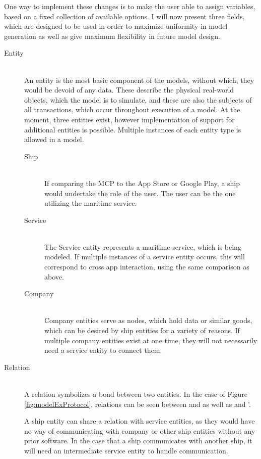 One way to implement these changes is to make the user able to assign variables, based on a fixed collection of available options. I will now present three fields, which are designed to be used in order to maximize uniformity in model generation as well as give maximum flexibility in future model design.
\begin{description}
	\item[Entity]\ \\
	An entity is the most basic component of the models, without which, they would be devoid of any data. These describe the physical real-world objects, which the model is to simulate, and these are also the subjects of all transactions, which occur throughout execution of a model. At the moment, three entities exist, however implementation of support for additional entities is possible.
	Multiple instances of each entity type is allowed in a model.\newpage
	\begin{description}
		\item[Ship]\ \\
			If comparing the MCP to the App Store or Google Play, a ship would undertake the role of the user. The user can be the one utilizing the maritime service.
		\item[Service]\ \\
			The Service entity represents a maritime service, which is being modeled. If multiple instances of a service entity occurs, this will correspond to cross app interaction, using the same comparison as above.
		\item[Company]\ \\
			Company entities serve as nodes, which hold data or similar goods, which can be desired by ship entities for a variety of reasons. If multiple company entities exist at one time, they will not necessarily need a service entity to connect them. 
	\end{description}
	\item[Relation]\ \\
		A relation symbolizes a bond between two entities. In the case of Figure \ref{fig:modelExProtocol}, relations can be seen between  and  as well as  and '.

		A ship entity can share a relation with service entities, as they would have no way of communicating with company or other ship entities without any prior software. In the case that a ship communicates with another ship, it will need an intermediate service entity to handle communication.


\end{description}
